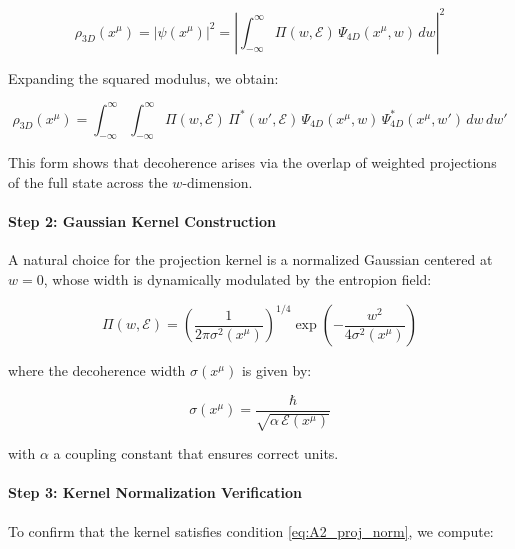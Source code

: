 \documentclass[12pt]{article}
\begin{document}
\begin{equation}
\rho_{3D}(x^\mu) = |\psi(x^\mu)|^2 = \left| \int_{-\infty}^{\infty} \Pi(w, \mathcal{E})\, \Psi_{4D}(x^\mu, w)\, dw \right|^2
\label{eq:A2_density_sq}
\end{equation}

Expanding the squared modulus, we obtain:

\begin{equation}
\rho_{3D}(x^\mu) = \int_{-\infty}^{\infty} \int_{-\infty}^{\infty} \Pi(w, \mathcal{E})\, \Pi^*(w', \mathcal{E})\, \Psi_{4D}(x^\mu, w)\, \Psi^*_{4D}(x^\mu, w')\, dw\, dw'
\label{eq:A2_density_expanded}
\end{equation}

This form shows that decoherence arises via the overlap of weighted projections of the full state across the \(w\)-dimension.

\vspace{1em}
\noindent
\paragraph{Step 2: Gaussian Kernel Construction}

A natural choice for the projection kernel is a normalized Gaussian centered at \(w = 0\), whose width is dynamically modulated by the entropion field:

\begin{equation}
\Pi(w, \mathcal{E}) = \left( \frac{1}{2\pi \sigma^2(x^\mu)} \right)^{1/4} \exp\left( -\frac{w^2}{4\sigma^2(x^\mu)} \right)
\label{eq:A2_gaussian_kernel}
\end{equation}

where the decoherence width \(\sigma(x^\mu)\) is given by:

\begin{equation}
\sigma(x^\mu) = \frac{\hbar}{\sqrt{\alpha\, \mathcal{E}(x^\mu)}}
\label{eq:A2_sigma_def}
\end{equation}

with \(\alpha\) a coupling constant that ensures correct units.

\vspace{1em}
\noindent
\paragraph{Step 3: Kernel Normalization Verification}

To confirm that the kernel satisfies condition \eqref{eq:A2_proj_norm}, we compute:
\end{document}
